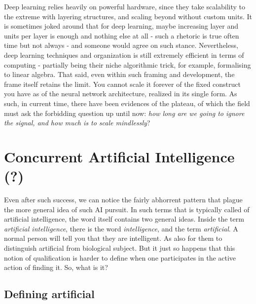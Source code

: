 Deep learning relies heavily on powerful hardware, since they take scalability to the extreme with layering structures, and scaling beyond without custom units. It is sometimes joked around that for deep learning, maybe increasing layer and units per layer is enough and nothing else at all - such a rhetoric is true often time but not always - and someone would agree on such stance. Nevertheless, deep learning techniques and organization is still extremely efficient in terms of computing - partially being their niche algorithmic trick, for example, formalising to linear algebra. That said, even within such framing and development, the frame itself retains the limit. You cannot scale it forever of the fixed construct you have as of the neural network architecture, realized in its single form. As such, in current time, there have been evidences of the plateau, of which the field must ask the forbidding question up until now: \textit{how long are we going to ignore the signal, and how much is to scale mindlessly}?

\section{Concurrent Artificial Intelligence (?)}

Even after such success, we can notice the fairly abhorrent pattern that plague the more general idea of such AI pursuit. In such terms that is typically called of artificial intelligence, the word itself contains two general ideas. Inside the term \textit{artificial intelligence}, there is the word \textit{intelligence}, and the term \textit{artificial}. A normal person will tell you that they are intelligent. As also for them to distinguish artificial from biological subject. But it just so happens that this notion of qualification is harder to define when one participates in the active action of finding it. So, what is it? 

\subsection{Defining artificial}

